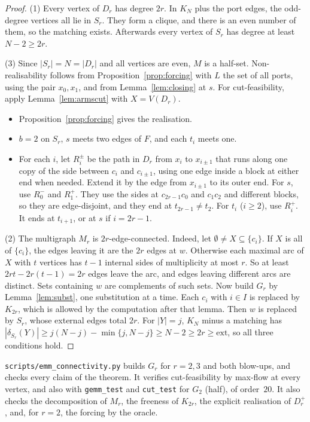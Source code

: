 \documentclass[11pt]{amsart}
\theoremstyle{definition}
\begin{document}
\begin{proof}
(1) Every vertex of $D_r$ has degree $2r$. In $K_N$ plus the port edges, the odd-degree vertices all
lie in $S_r$. They form a clique, and there is an even number of them, so the matching exists.
Afterwards every vertex of $S_r$ has degree at least $N-2\ge 2r$.

(3) Since $|S_r|=N=|D_r|$ and all vertices are even, $M$ is a half-set. Non-realisability follows
from Proposition~\ref{prop:forcing} with $L$ the set of all ports, using the pair $x_0,x_1$, and from
Lemma~\ref{lem:closing} at $s$. For cut-feasibility, apply Lemma~\ref{lem:armscut} with $X=V(D_r)$.
\begin{itemize}
\item[(i)] Proposition~\ref{prop:forcing} gives the realisation.
\item[(ii)] $b=2$ on $S_r$, $s$ meets two edges of $F$, and each $t_i$ meets one.
\item[(iii)] For each $i$, let $R_i^\pm$ be the path in $D_r$ from $x_i$ to $x_{i\pm1}$ that runs
along one copy of the side between $c_i$ and $c_{i\pm1}$, using one edge inside a block at either end
when needed. Extend it by the edge from $x_{i\pm1}$ to its outer end. For $s$, use $R_0^-$ and
$R_1^+$. They use the sides at $c_{2r-1}c_0$ and $c_1c_2$ and different blocks, so they are
edge-disjoint, and they end at $t_{2r-1}\ne t_2$. For $t_i$ ($i\ge2$), use $R_i^+$. It ends at
$t_{i+1}$, or at $s$ if $i=2r-1$.
\end{itemize}

(2) The multigraph $M_r$ is $2r$-edge-connected. Indeed, let $\emptyset\ne X\subseteq\{c_i\}$. If $X$ is
all of $\{c_i\}$, the edges leaving it are the $2r$ edges at $w$. Otherwise each maximal arc of $X$
with $t$ vertices has $t-1$ internal sides of multiplicity at most $r$. So at least
$2rt-2r(t-1)=2r$ edges leave the arc, and edges leaving different arcs are distinct. Sets containing
$w$ are complements of such sets. Now build $G_r$ by Lemma~\ref{lem:subst}, one substitution at a
time. Each $c_i$ with $i\in I$ is replaced by $K_{2r}$, which is allowed by the computation after
that lemma. Then $w$ is replaced by $S_r$, whose external edges total $2r$. For $|Y|=j$, $K_N$ minus a
matching has $|\delta_{S_r}(Y)|\ge j(N-j)-\min\{j,N-j\}\ge N-2\ge2r\ge\mathrm{ext}$, so all three
conditions hold.
\end{proof}

\texttt{scripts/emm\_connectivity.py} builds $G_r$ for $r=2,3$ and both blow-ups, and checks every
claim of the theorem. It verifies cut-feasibility by max-flow at every vertex, and also with
\texttt{gemm\_test} and \texttt{cut\_test} for $G_2$ (half), of order~$20$. It also checks the
decomposition of $M_r$, the freeness of $K_{2r}$, the explicit realisation of $D_r^+$, and, for $r=2$,
the forcing by the oracle.
\end{document}
